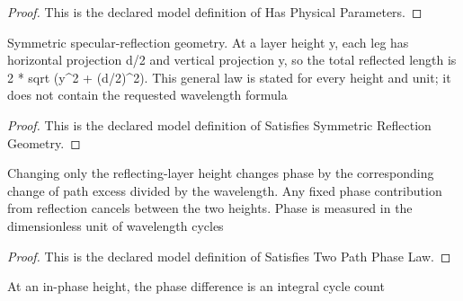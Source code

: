 \begin{proof}
  This is the declared model definition of Has Physical Parameters.
\end{proof}
\begin{definition}
  \label{def:physics:phyx-mini-0329:phyxminiproblems-problemphyxmini0329-satisfiessymmetricreflectiongeometry}
  Symmetric specular-reflection geometry. At a layer height y, each leg has horizontal projection d/2 and vertical projection y, so the total reflected length is 2 * sqrt (y\textasciicircum{}2 + (d/2)\textasciicircum{}2). This general law is stated for every height and unit; it does not contain the requested wavelength formula
\end{definition}
\begin{proof}
  This is the declared model definition of Satisfies Symmetric Reflection Geometry.
\end{proof}
\begin{definition}
  \label{def:physics:phyx-mini-0329:phyxminiproblems-problemphyxmini0329-satisfiestwopathphaselaw}
  Changing only the reflecting-layer height changes phase by the corresponding change of path excess divided by the wavelength. Any fixed phase contribution from reflection cancels between the two heights. Phase is measured in the dimensionless unit of wavelength cycles
\end{definition}
\begin{proof}
  This is the declared model definition of Satisfies Two Path Phase Law.
\end{proof}
\begin{definition}
  \label{def:physics:phyx-mini-0329:phyxminiproblems-problemphyxmini0329-wavesareinphaseat}
  At an in-phase height, the phase difference is an integral cycle count
\end{definition}
